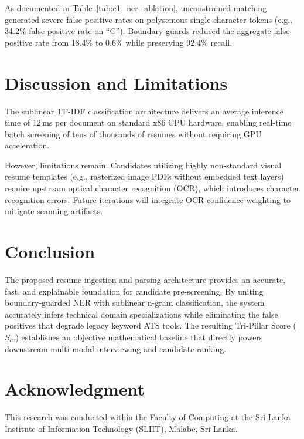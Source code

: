 \documentclass[conference]{IEEEtran}
\begin{document}
As documented in Table~\ref{tab:c1_ner_ablation}, unconstrained matching generated severe false positive rates on polysemous single-character tokens (e.g., 34.2\% false positive rate on ``C''). Boundary guards reduced the aggregate false positive rate from 18.4\% to 0.6\% while preserving 92.4\% recall.

\section{Discussion and Limitations}
The sublinear TF-IDF classification architecture delivers an average inference time of 12\,ms per document on standard x86 CPU hardware, enabling real-time batch screening of tens of thousands of resumes without requiring GPU acceleration.

However, limitations remain. Candidates utilizing highly non-standard visual resume templates (e.g., rasterized image PDFs without embedded text layers) require upstream optical character recognition (OCR), which introduces character recognition errors. Future iterations will integrate OCR confidence-weighting to mitigate scanning artifacts.

\section{Conclusion}
The proposed resume ingestion and parsing architecture provides an accurate, fast, and explainable foundation for candidate pre-screening. By uniting boundary-guarded NER with sublinear n-gram classification, the system accurately infers technical domain specializations while eliminating the false positives that degrade legacy keyword ATS tools. The resulting Tri-Pillar Score ($S_{cv}$) establishes an objective mathematical baseline that directly powers downstream multi-modal interviewing and candidate ranking.

\section*{Acknowledgment}
This research was conducted within the Faculty of Computing at the Sri Lanka Institute of Information Technology (SLIIT), Malabe, Sri Lanka.
\end{document}

